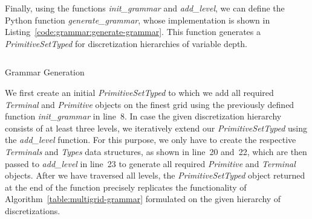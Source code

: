 Finally, using the functions \emph{init\_grammar} and \emph{add\_level}, we can define the Python function \emph{generate\_grammar}, whose implementation is shown in Listing~\ref{code:grammar:generate-grammar}. 
This function generates a \emph{PrimitiveSetTyped} for discretization hierarchies of variable depth.
\begin{listing}
	\inputminted[linenos]{python}{evostencils/grammar/generate_grammar.py}
	\caption{Grammar Generation}
	\label{code:grammar:generate-grammar}
\end{listing}
We first create an initial \emph{PrimitiveSetTyped} to which we add all required \emph{Terminal} and \emph{Primitive} objects on the finest grid using the previously defined function \emph{init\_grammar} in line~8.
In case the given discretization hierarchy consists of at least three levels, we iteratively extend our \emph{PrimitiveSetTyped} using the \emph{add\_level} function.
For this purpose, we only have to create the respective \emph{Terminals} and \emph{Types} data structures, as shown in line~20 and~22, which are then passed to \emph{add\_level} in line~23 to generate all required \emph{Primitive} and \emph{Terminal} objects.
After we have traversed all levels, the \emph{PrimitiveSetTyped} object returned at the end of the function precisely replicates the functionality of Algorithm~\ref{table:multigrid-grammar} formulated on the given hierarchy of discretizations.

